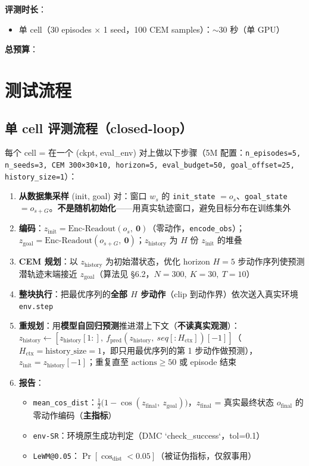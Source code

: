 \documentclass[11pt,a4paper]{article}
\begin{document}
\textbf{评测时长}：
\begin{itemize}[leftmargin=2em]
    \item 单 cell（30 episodes × 1 seed，100 CEM samples）：$\sim 30$ 秒（单 GPU）
\end{itemize}

\textbf{总预算}：
\section{测试流程}

\subsection{单 cell 评测流程（closed-loop）}

每个 cell = 在一个 (ckpt, eval\_env) 对上做以下步骤（5M 配置：\texttt{n\_episodes=5, n\_seeds=3, CEM 300×30×10, horizon=5, eval\_budget=50, goal\_offset=25, history\_size=1}）：

\begin{enumerate}[leftmargin=2em]
    \item \textbf{从数据集采样} (init, goal) 对：窗口 $w_s$ 的 \texttt{init\_state} $= o_s$、\texttt{goal\_state} $= o_{s+G}$。\textbf{不是随机初始化}——用真实轨迹窗口，避免目标分布在训练集外
    \item \textbf{编码}：$z_{\text{init}} = \mathrm{Enc}\text{-}\mathrm{Readout}(o_s,\ \mathbf 0)$（零动作，\texttt{encode\_obs}）；$z_{\text{goal}} = \mathrm{Enc}\text{-}\mathrm{Readout}(o_{s+G},\ \mathbf 0)$；$z_\text{history}$ 为 $H$ 份 $z_{\text{init}}$ 的堆叠
    \item \textbf{CEM 规划}：以 $z_\text{history}$ 为初始潜状态，优化 horizon $H=5$ 步动作序列使预测潜轨迹末端接近 $z_\text{goal}$（算法见 §6.2，$N=300,\ K=30,\ T=10$）
    \item \textbf{整块执行}：把最优序列的\textbf{全部 $H$ 步动作}（clip 到动作界）依次送入真实环境 \texttt{env.step}
    \item \textbf{重规划}：用\textbf{模型自回归预测}推进潜上下文（\textbf{不读真实观测}）：$z_\text{history} \leftarrow [z_\text{history}[1:],\ f_{\text{pred}}(z_\text{history},\ seq[:H_{\text{ctx}}])[-1]]$（$H_{\text{ctx}} = \text{history\_size} = 1$，即只用最优序列的第 1 步动作做预测），$z_{\text{init}} = z_\text{history}[-1]$；重复直至 $\text{actions} \geq 50$ 或 episode 结束
    \item \textbf{报告}：
    \begin{itemize}
        \item \texttt{mean\_cos\_dist}：$\tfrac{1}{2}\big(1 - \cos(z_{\text{final}},\ z_{\text{goal}})\big)$，$z_{\text{final}}$ = 真实最终状态 $o_{\text{final}}$ 的零动作编码（\textbf{主指标}）
        \item \texttt{env-SR}：环境原生成功判定（DMC `check\_success`，tol=0.1）
        \item \texttt{LeWM@0.05}：$\Pr[\cos_\text{dist} < 0.05]$（被证伪指标，仅叙事用）
    \end{itemize}
\end{enumerate}
\end{document}
